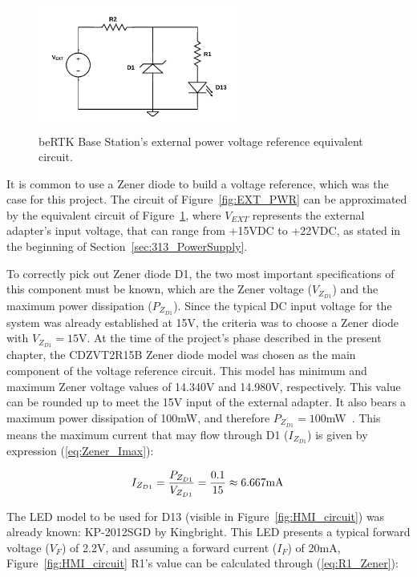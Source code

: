 \begin{figure}[h]
	\centering
	\includegraphics[width=0.6\textwidth]{Chapters/Figures/chapter3/EXT_PWR_2.pdf}
	\caption{beRTK\textsuperscript{\textregistered} Base Station's external power voltage reference equivalent circuit.}
	\label{fig:EXT_PWR_2}
\end{figure}

It is common to use a Zener diode to build a voltage reference, which was the case for this project. The circuit of Figure~\ref{fig:EXT_PWR} can be approximated by the equivalent circuit of Figure~\ref{fig:EXT_PWR_2}, where $V_{EXT}$ represents the external adapter's input voltage, that can range from +15VDC to +22VDC, as stated in the beginning of Section~\ref{sec:313_PowerSupply}.

To correctly pick out Zener diode D1, the two most important specifications of this component must be known, which are the Zener voltage ($V_{Z_{D1}}$) and the maximum power dissipation ($P_{Z_{D1}}$). Since the typical DC input voltage for the system was already established at 15V, the criteria was to choose a Zener diode with $V_{Z_{D1}}=15$V. At the time of the project's phase described in the present chapter, the CDZVT2R15B Zener diode model was chosen as the main component of the voltage reference circuit. This model has minimum and maximum Zener voltage values of 14.340V and 14.980V, respectively.
This value can be rounded up to meet the 15V input of the external adapter.
It also bears a maximum power dissipation of 100mW, and therefore $P_{Z_{D1}}=100$mW~\cite{CDZVT2R15B}. This means the maximum current that may flow through D1 ($I_{Z_{D1}}$) is given by expression (\ref{eq:Zener_Imax}):

\begin{equation}\label{eq:Zener_Imax}
	I_{Z_{D1}}=\frac{P_{Z_{D1}}}{V_{Z_{D1}}}=\frac{0.1}{15} \approx 6.667 \textrm{mA}\,\medskip
\end{equation}

The LED model to be used for D13 (visible in Figure~\ref{fig:HMI_circuit}) was already known: KP-2012SGD by Kingbright. This LED presents a typical forward voltage ($V_F$) of 2.2V, and assuming a forward current ($I_F$) of 20mA, Figure~\ref{fig:HMI_circuit} R1's value can be calculated through (\ref{eq:R1_Zener}):

